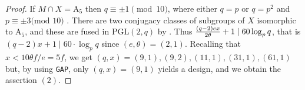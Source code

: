 \documentclass[a4paper,twopage,reqno,12pt]{amsart}
\theoremstyle{definition}
\numberwithin{equation}{section}
\newcommand{\PGL}{\mathrm{PGL}}
\newcommand{\A}{\mathrm{A}}
\begin{document}
\begin{proof}
If $M\cap X=\A_{5}$ then $q\equiv \pm 1\pmod{10}$, where either $q=p$ or $q=p^2$ and $p\equiv \pm 3\text{(mod 10)}$ . There are
two conjugacy classes of subgroups of $X$ isomorphic to $\A_{5}$, and these are fused in $\PGL(2,q)$ by \cite[§ 259]{Di}. Thus $\frac{%
\left( q-2\right) ex}{2\theta }+1\mid 60\log _{p}q$, that is $\left( q-2\right) x+1\mid 60 \cdot \log_{p}q$ since $(e,\theta)=(2,1)$. %
Recalling that $x<10\theta f/e=5f$, we get $(q,x)=(9,1),(9,2), (11,1),(31,1), (61,1)$ 
but, by using \texttt{GAP}, only $(q,x)=(9,1)$ yields a design, and we obtain the assertion $(2)$.%
\end{proof}
\end{document}
